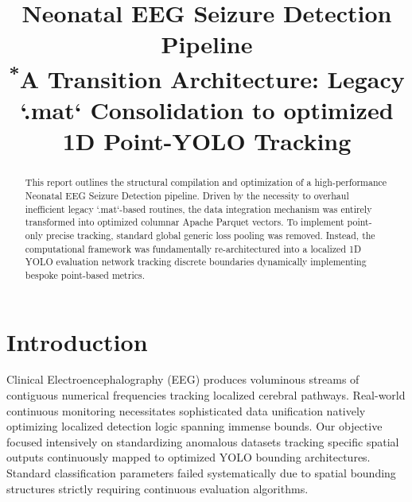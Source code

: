 \documentclass[conference]{IEEEtran}
\begin{document}
\title{Neonatal EEG Seizure Detection Pipeline\\
{\footnotesize \textsuperscript{*}A Transition Architecture: Legacy `.mat` Consolidation to optimized 1D Point-YOLO Tracking}}

\author{
}

\maketitle

\begin{abstract}
This report outlines the structural compilation and optimization of a high-performance Neonatal EEG Seizure Detection pipeline. Driven by the necessity to overhaul inefficient legacy `.mat`-based routines, the data integration mechanism was entirely transformed into optimized columnar Apache Parquet vectors. To implement point-only precise tracking, standard global generic loss pooling was removed. Instead, the computational framework was fundamentally re-architectured into a localized 1D YOLO evaluation network tracking discrete boundaries dynamically implementing bespoke point-based metrics.
\end{abstract}

\section{Introduction}
Clinical Electroencephalography (EEG) produces voluminous streams of contiguous numerical frequencies tracking localized cerebral pathways. Real-world continuous monitoring necessitates sophisticated data unification natively optimizing localized detection logic spanning immense bounds. Our objective focused intensively on standardizing anomalous datasets tracking specific spatial outputs continuously mapped to optimized YOLO bounding architectures. Standard classification parameters failed systematically due to spatial bounding structures strictly requiring continuous evaluation algorithms.
\end{document}
